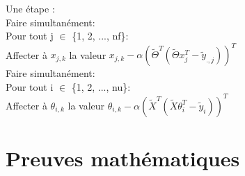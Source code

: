 \documentclass[a4paper,10pt]{article}
\begin{document}
\noindent Une \'{e}tape :\\
\indent Faire simultan\'{e}ment:\\
\indent \indent Pour tout j $\in$ \{1, 2, ..., nf\}:\\
\indent \indent \indent Affecter \`{a} $x_{j,k}$ la valeur $x_{j,k}-\alpha(\tilde{\Theta}^{T}(\tilde{\Theta}x_{j}^{T}-\tilde{y}_{.,j}))^{T}$\\
\indent Faire simultan\'{e}ment:\\
\indent \indent Pour tout i $\in$ \{1, 2, ..., nu\}:\\
\indent \indent \indent Affecter \`{a} $\theta_{i,k}$ la valeur $\theta_{i,k}-\alpha(\tilde{X}^{T}(\tilde{X}\theta_{i}^{T}-\tilde{y}_{i}))^{T}$\\

\newpage

\section{Preuves mathématiques}
\end{document}
